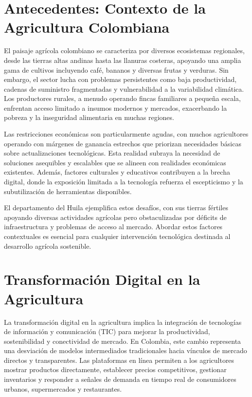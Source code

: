 \section{Antecedentes: Contexto de la Agricultura Colombiana}

El paisaje agrícola colombiano se caracteriza por diversos ecosistemas regionales, desde las tierras altas andinas hasta las llanuras costeras, apoyando una amplia gama de cultivos incluyendo café, bananos y diversas frutas y verduras. Sin embargo, el sector lucha con problemas persistentes como baja productividad, cadenas de suministro fragmentadas y vulnerabilidad a la variabilidad climática. Los productores rurales, a menudo operando fincas familiares a pequeña escala, enfrentan acceso limitado a insumos modernos y mercados, exacerbando la pobreza y la inseguridad alimentaria en muchas regiones.

Las restricciones económicas son particularmente agudas, con muchos agricultores operando con márgenes de ganancia estrechos que priorizan necesidades básicas sobre actualizaciones tecnológicas. Esta realidad subraya la necesidad de soluciones asequibles y escalables que se alineen con realidades económicas existentes. Además, factores culturales y educativos contribuyen a la brecha digital, donde la exposición limitada a la tecnología refuerza el escepticismo y la subutilización de herramientas disponibles.

El departamento del Huila ejemplifica estos desafíos, con sus tierras fértiles apoyando diversas actividades agrícolas pero obstaculizadas por déficits de infraestructura y problemas de acceso al mercado. Abordar estos factores contextuales es esencial para cualquier intervención tecnológica destinada al desarrollo agrícola sostenible.

\section{Transformación Digital en la Agricultura}

La transformación digital en la agricultura implica la integración de tecnologías de información y comunicación (TIC) para mejorar la productividad, sostenibilidad y conectividad de mercado. En Colombia, este cambio representa una desviación de modelos intermediados tradicionales hacia vínculos de mercado directos y transparentes. Las plataformas en línea permiten a los agricultores mostrar productos directamente, establecer precios competitivos, gestionar inventarios y responder a señales de demanda en tiempo real de consumidores urbanos, supermercados y restaurantes.

